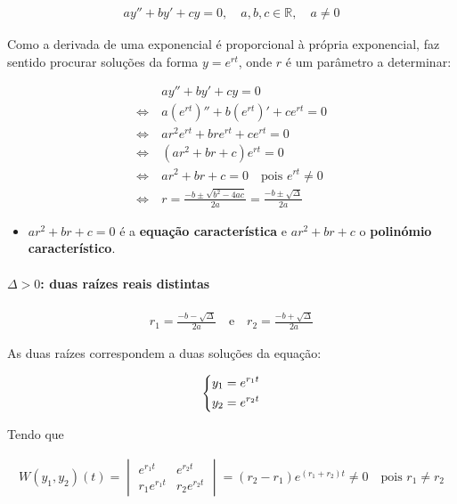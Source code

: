 \documentclass{article}
\begin{document}
\begin{gather*}
\boxed{ay'' + by' + cy = 0, \quad a, b, c \in \mathbb{R}, \quad a \neq 0}
\end{gather*}

Como a derivada de uma exponencial é proporcional à própria exponencial, faz sentido
procurar soluções da forma $y = e^{rt}$, onde $r$ é um parâmetro a determinar:

\begin{align*}
& ay'' + by' + cy = 0 \\
\Leftrightarrow \ & a \left( e^{rt} \right)'' + b \left( e^{rt} \right)' + c e^{rt} = 0 \\
\Leftrightarrow \ & a r^2 e^{rt} + b r e^{rt} + c e^{rt} = 0 \\
\Leftrightarrow \ & \left( a r^2 + b r + c \right) e^{rt} = 0 \\
\Leftrightarrow \ & a r^2 + b r + c = 0 \quad \text{pois } e^{rt} \neq 0 \\
\Leftrightarrow \ & r = \frac{-b \pm \sqrt{b^2 - 4ac}}{2a} = \frac{-b \pm \sqrt{\Delta}}{2a}
\end{align*}

\begin{itemize}
    \item $a r^2 + b r + c = 0$ é a \textbf{equação característica} e $a r^2 + b r + c$ o
    \textbf{polinómio característico}.
\end{itemize}

\paragraph{$\Delta > 0$: duas raízes reais distintas}

\begin{gather*}
r_1 = \frac{-b - \sqrt{\Delta}}{2a} \quad \text{e} \quad r_2 = \frac{-b + \sqrt{\Delta}}{2a}
\end{gather*}

As duas raízes correspondem a duas soluções da equação:

\begin{gather*}
\begin{dcases}
y_1 = e^{r_1 t} \\
y_2 = e^{r_2 t}
\end{dcases}
\end{gather*}

Tendo que

\begin{gather*}
W(y_1, y_2)(t) =
\begin{vmatrix}
e^{r_1 t} & e^{r_2 t} \\
r_1 e^{r_1 t} & r_2 e^{r_2 t}
\end{vmatrix}
= (r_2 - r_1) e^{(r_1 + r_2)t} \neq 0 \quad \text{pois } r_1 \neq r_2
\end{gather*}
\end{document}

